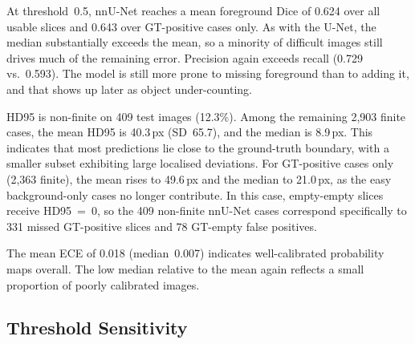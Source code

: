 \documentclass[logo,bsc,singlespacing,parskip,online]{infthesis}
\begin{document}
At threshold~0.5, nnU-Net reaches a mean foreground Dice of 0.624 over all
usable slices and 0.643 over GT-positive cases only. As with the U-Net, the median
substantially exceeds the mean, so a minority of difficult images still drives
much of the remaining error. Precision again exceeds recall
(0.729 vs.\ 0.593). The model is still more prone to missing foreground than to
adding it, and that shows up later as object under-counting.

HD95 is non-finite on 409 test images (12.3\%). Among the remaining 2,903
finite cases, the mean HD95 is 40.3\,px (SD~65.7), and the median is 8.9\,px.
This indicates that most predictions lie close to the ground-truth boundary,
with a smaller subset exhibiting large localised deviations. For GT-positive
cases only (2,363 finite), the mean rises to
49.6\,px and the median to 21.0\,px, as the easy background-only cases no
longer contribute. In this case, empty-empty slices receive
HD95~=~0, so the 409 non-finite nnU-Net cases correspond specifically to 331
missed GT-positive slices and 78 GT-empty false positives.

The mean ECE of 0.018 (median~0.007) indicates well-calibrated probability
maps overall. The low median relative to the mean
again reflects a small proportion of poorly calibrated images.

\subsection{Threshold Sensitivity}
\label{sec:nnunet-threshold}
\end{document}
